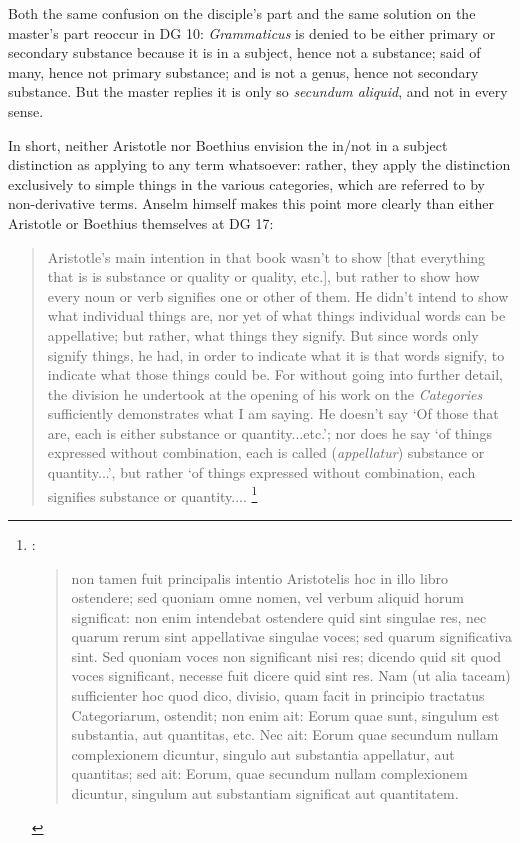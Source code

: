 \documentclass[]{article}
\begin{document}
Both the same confusion on the disciple's part and the same solution on the master's part reoccur in DG 10: \textit{Grammaticus} is denied to be either primary or secondary substance because it is in a subject, hence not a substance; said of many, hence not primary substance; and is not a genus, hence not secondary substance. But the master replies it is only so \textit{secundum aliquid}, and not in every sense.

In short, neither Aristotle nor Boethius envision the in/not in a subject distinction as applying to any term whatsoever: rather, they apply the distinction exclusively to simple things in the various categories, which are referred to by non-derivative terms. Anselm himself makes this point more clearly than either Aristotle or Boethius themselves at DG 17: 
\begin{quote}
Aristotle's main intention in that book wasn't to show [that everything that is is substance or quality or quality, etc.], but rather to show how every noun or verb signifies one or other of them. He didn't intend to show what individual things are, nor yet of what things individual words can be appellative; but rather, what things they signify. But since words only signify things, he had, in order to indicate what it is that words signify, to indicate what those things could be. For without going into further detail, the division he undertook at the opening of his work on the \textit{Categories} sufficiently demonstrates what I am saying. He doesn't say `Of those that are, each is either substance or quantity...etc.'; nor does he say `of things expressed without combination, each is called (\textit{appellatur}) substance or quantity...', but rather `of things expressed without combination, each signifies substance or quantity.... \footnote{\cite[pp. 72-73, alt.]{Henry1974}:
\begin{quote}
non tamen fuit principalis intentio Aristotelis hoc in illo libro ostendere; sed quoniam omne nomen, vel verbum aliquid horum significat: non enim intendebat ostendere quid sint singulae res, nec quarum rerum sint appellativae singulae voces; sed quarum significativa sint. Sed quoniam voces non significant nisi res; dicendo quid sit quod voces significant, necesse fuit dicere quid sint res. Nam (ut alia taceam) sufficienter hoc quod dico, divisio, quam facit in principio tractatus Categoriarum, ostendit; non enim ait: Eorum quae sunt, singulum est substantia, aut quantitas, etc. Nec ait: Eorum quae secundum nullam complexionem dicuntur, singulo aut substantia appellatur, aut quantitas; sed ait: Eorum, quae secundum nullam complexionem dicuntur, singulum aut substantiam significat aut quantitatem.
\end{quote}}
\end{quote} 
\end{document}
